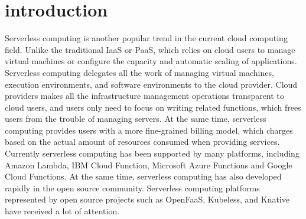 \section{introduction}

Serverless computing is another popular trend in the current cloud computing field.
Unlike the traditional IaaS\cite{iaas} or PaaS\cite{paas},
which relies on cloud users to manage virtual machines or configure the capacity and automatic scaling of applications.
Serverless computing delegates all the work of managing virtual machines, execution environments, and software environments to the cloud provider.
Cloud providers makes all the infrastructure management operations transparent to cloud users,
and users only need to focus on writing related functions, which frees users from the trouble of managing servers.
At the same time, serverless computing provides users with a more fine-grained billing model,
which charges based on the actual amount of resources consumed when providing services. Currently serverless computing has been supported by many platforms, including Amazon Lambda\cite{amazon}, IBM Cloud Func\-tion\cite{ibm},
Microsoft Azure Func\-tions\cite{microsoft} and Google Cloud Func\-tions\cite{google}.
At the same time, serverless computing has also developed rapidly in the open source community.
Serverless computing platforms represented by open source projects such as Open\-FaaS\cite{openfaas}, Kube\-less\cite{kubeless}, and K\-native\cite{knative} have received a lot of attention.

